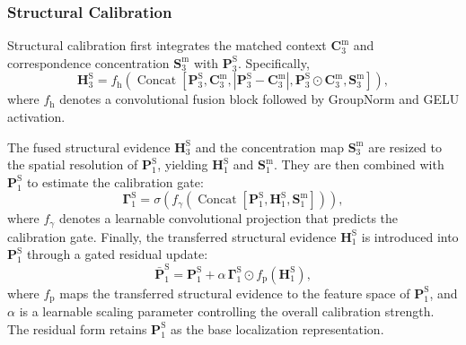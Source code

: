 \documentclass[runningheads]{llncs}
\begin{document}
\subsubsection{Structural Calibration}

Structural calibration first integrates the matched context $\mathbf{C}_{3}^{\mathrm{m}}$ and correspondence concentration $\mathbf{S}_{3}^{\mathrm{m}}$ with $\mathbf{P}_{3}^{\mathrm{S}}$. Specifically,
\begin{equation}
\mathbf{H}_{3}^{\mathrm{S}}
=
f_{\mathrm{h}}\!\left(
\operatorname{Concat}\!\left[
\mathbf{P}_{3}^{\mathrm{S}},
\mathbf{C}_{3}^{\mathrm{m}},
\left|\mathbf{P}_{3}^{\mathrm{S}}-\mathbf{C}_{3}^{\mathrm{m}}\right|,
\mathbf{P}_{3}^{\mathrm{S}}\odot\mathbf{C}_{3}^{\mathrm{m}},
\mathbf{S}_{3}^{\mathrm{m}}
\right]\right),
\label{eq:dspm_evidence_fusion}
\end{equation}
where $f_{\mathrm{h}}$ denotes a convolutional fusion block followed by GroupNorm and GELU activation.

The fused structural evidence $\mathbf{H}_{3}^{\mathrm{S}}$ and the concentration map $\mathbf{S}_{3}^{\mathrm{m}}$ are resized to the spatial resolution of $\mathbf{P}_{1}^{\mathrm{S}}$, yielding $\mathbf{H}_{1}^{\mathrm{S}}$ and $\mathbf{S}_{1}^{\mathrm{m}}$. They are then combined with $\mathbf{P}_{1}^{\mathrm{S}}$ to estimate the calibration gate:
\begin{equation}
\boldsymbol{\Gamma}_{1}^{\mathrm{S}}
=
\sigma\!\left(
f_{\gamma}\!\left(
\operatorname{Concat}\!\left[
\mathbf{P}_{1}^{\mathrm{S}},
\mathbf{H}_{1}^{\mathrm{S}},
\mathbf{S}_{1}^{\mathrm{m}}
\right]\right)
\right),
\label{eq:dspm_gate}
\end{equation}
where $f_{\gamma}$ denotes a learnable convolutional projection that predicts the calibration gate. Finally, the transferred structural evidence $\mathbf{H}_{1}^{\mathrm{S}}$ is introduced into $\mathbf{P}_{1}^{\mathrm{S}}$ through a gated residual update:
\begin{equation}
\bar{\mathbf{P}}_{1}^{\mathrm{S}}
=
\mathbf{P}_{1}^{\mathrm{S}}
+
\alpha\,
\boldsymbol{\Gamma}_{1}^{\mathrm{S}}
\odot
f_{\mathrm{p}}\!\left(\mathbf{H}_{1}^{\mathrm{S}}\right),
\label{eq:dspm_calibration}
\end{equation}
where $f_{\mathrm{p}}$ maps the transferred structural evidence to the feature space of $\mathbf{P}_{1}^{\mathrm{S}}$, and $\alpha$ is a learnable scaling parameter controlling the overall calibration strength. The residual form retains $\mathbf{P}_{1}^{\mathrm{S}}$ as the base localization representation.
\end{document}
